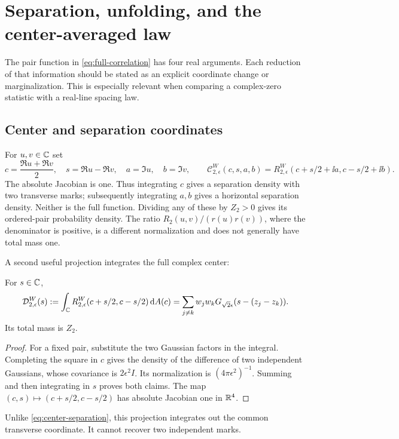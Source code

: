 \section{Separation, unfolding, and the center-averaged law}\label{sec:centers}

The pair function in \eqref{eq:full-correlation} has four real arguments.
Each reduction of that information should be stated as an explicit
coordinate change or marginalization. This is especially relevant when
comparing a complex-zero statistic with a real-line spacing law.

\subsection{Center and separation coordinates}

For $u,v\in\mathbb C$ set
\begin{equation}\label{eq:center-separation}
 c=\frac{\Re u+\Re v}{2},\quad s=\Re u-\Re v,
 \quad a=\Im u,\quad b=\Im v,
 \qquad
 \mathcal C_{2,\epsilon}^W(c,s,a,b)
    =R_{2,\epsilon}^W(c+s/2+\ii a,c-s/2+\ii b).
\end{equation}
The absolute Jacobian is one. Thus integrating $c$ gives a separation
density with two transverse marks; subsequently integrating $a,b$
gives a horizontal separation density. Neither is the full function.
Dividing any of these by $Z_2>0$ gives its ordered-pair probability
density. The ratio $R_2(u,v)/(r(u)r(v))$, where the denominator is
positive, is a different normalization and does not generally have
total mass one.

A second useful projection integrates the full complex center:
\begin{proposition}\label{prop:separation}
For $s\in\mathbb C$,
\begin{equation}\label{eq:separation-gaussian}
 \mathcal D_{2,\epsilon}^W(s)
 :=\int_\mathbb C R_{2,\epsilon}^W(c+s/2,c-s/2)\,\mathrm d A(c)
 =\sum_{j\ne k}w_jw_k
                  G_{\sqrt2\epsilon}(s-(z_j-z_k)).
\end{equation}
Its total mass is $Z_2$.
\end{proposition}
\begin{proof}
For a fixed pair, substitute the two Gaussian factors in the integral.
Completing the square in $c$ gives the density of the difference of
two independent Gaussians, whose covariance is $2\epsilon^2 I$.
Its normalization is $(4\pi\epsilon^2)^{-1}$. Summing and then
integrating in $s$ proves both claims. The map
$(c,s)\mapsto(c+s/2,c-s/2)$ has absolute Jacobian one in $\mathbb R^4$.
\end{proof}
Unlike \eqref{eq:center-separation}, this projection integrates out the
common transverse coordinate. It cannot recover two independent marks.

